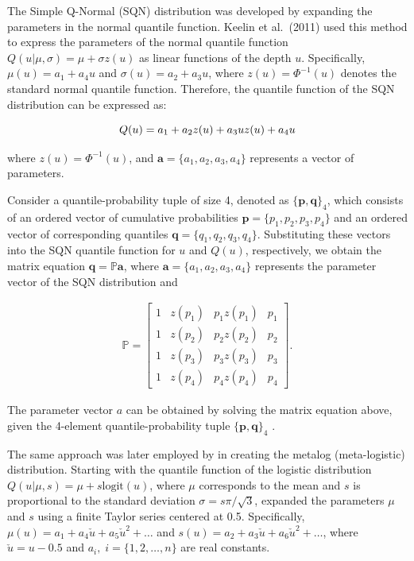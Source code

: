 \documentclass[
  fleqn,
  deca,
  blindrev
]{informs4}
\begin{document}
The Simple Q-Normal (SQN) distribution was developed by expanding the
parameters in the normal quantile function. Keelin et al.~(2011) used
this method to express the parameters of the normal quantile function
\(Q(u\vert\mu,\sigma)=\mu+\sigma z(u)\) as linear functions of the depth
\(u\). Specifically, \(\mu(u)=a_1+a_4u\) and \(\sigma(u)=a_2+a_3u\),
where \(z(u)=\Phi^{-1}(u)\) denotes the standard normal quantile
function. Therefore, the quantile function of the SQN distribution can
be expressed as:

\[
Q(u)= a_1+a_2z(u)+a_3uz(u)+a_4u\\
\]

where \(z(u)=\Phi^{-1}(u)\), and \(\mathbf{a}=\{a_1,a_2,a_3, a_4\}\)
represents a vector of parameters.

Consider a quantile-probability tuple of size 4, denoted as
\(\{\mathbf{p}, \mathbf{q}\}_4\), which consists of an ordered vector of
cumulative probabilities \(\mathbf{p}=\{p_1,p_2,p_3, p_4\}\) and an
ordered vector of corresponding quantiles
\(\mathbf{q}=\{q_1,q_2,q_3, q_4\}\). Substituting these vectors into the
SQN quantile function for \(u\) and \(Q(u)\), respectively, we obtain
the matrix equation \(\mathbf{q}=\mathbb P\mathbf{a}\), where
\(\mathbf{a}=\{a_1, a_2, a_3, a_4\}\) represents the parameter vector of
the SQN distribution and

\[
\begin{gathered}
\mathbb P=\begin{bmatrix} 1 & z(p_1) & p_1z(p_1) & p_1\\
                1 & z(p_2) & p_2z(p_2) & p_2\\
                1 & z(p_3) & p_3z(p_3) & p_3\\
                1 & z(p_4) & p_4z(p_4) & p_4\end{bmatrix}.
\end{gathered}
\]

The parameter vector \(a\) can be obtained by solving the matrix
equation above, given the 4-element quantile-probability tuple
\(\{\mathbf{p}, \mathbf{q}\}_4\)
\citep{keelin2011QuantileParameterizedDistributions, perepolkin2021HybridElicitationIndirect}.

The same approach was later employed by
\citet{keelin2016MetalogDistributions} in creating the metalog
(meta-logistic) distribution. Starting with the quantile function of the
logistic distribution \(Q(u\vert\mu,s)=\mu+s\text{logit}(u)\), where
\(\mu\) corresponds to the mean and \(s\) is proportional to the
standard deviation \(\sigma=s\pi/\sqrt3\),
\citet{keelin2016MetalogDistributions} expanded the parameters \(\mu\)
and \(s\) using a finite Taylor series centered at 0.5. Specifically,
\(\mu(u)=a_1+a_4\check{u}+a_5\check{u}^2+\dots\) and
\(s(u)=a_2+a_3\check{u}+a_6\check{u}^2+\dots\), where
\(\check{u}=u-0.5\) and \(a_i, \; i = \{1,2,\dots,n\}\) are real
constants.
\end{document}
